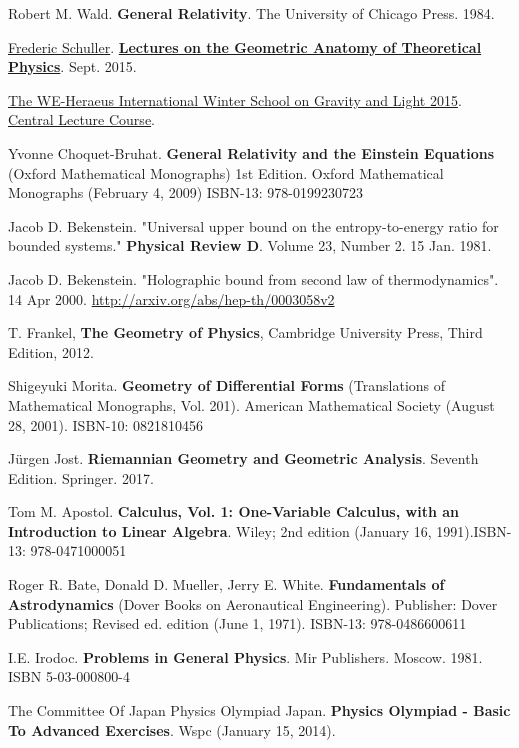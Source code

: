 \documentclass[10pt]{amsart}
\begin{document}
\begin{thebibliography}{9}
Robert M. Wald. \textbf{General Relativity}. The University of Chicago Press. 1984.

\href{https://www.youtube.com/c/FredericSchuller}{Frederic Schuller}. \href{https://youtube.com/playlist?list=PLPH7f_7ZlzxTi6kS4vCmv4ZKm9u8g5yic}{\textbf{Lectures on the Geometric Anatomy of Theoretical Physics}}. Sept. 2015.

\href{https://www.youtube.com/@thewe-heraeusinternational2060/featured}{The WE-Heraeus International Winter School on Gravity and Light 2015}. \href{https://youtube.com/playlist?list=PLFeEvEPtX_0S6vxxiiNPrJbLu9aK1UVC_}{Central Lecture Course}.  

Yvonne Choquet-Bruhat.  \textbf{General Relativity and the Einstein Equations} (Oxford Mathematical Monographs) 1st Edition.  Oxford Mathematical Monographs (February 4, 2009) ISBN-13: 978-0199230723

Jacob D. Bekenstein. "Universal upper bound on the entropy-to-energy ratio for bounded systems." \textbf{Physical Review D}. Volume 23, Number 2. 15 Jan. 1981.

Jacob D. Bekenstein. "Holographic bound from second law of thermodynamics". 14 Apr 2000. \url{http://arxiv.org/abs/hep-th/0003058v2}


T. Frankel,
\textbf{The Geometry of Physics}, 
Cambridge University Press, 
Third Edition,
2012.

Shigeyuki Morita. \textbf{Geometry of Differential Forms} (Translations of Mathematical Monographs, Vol. 201). American Mathematical Society (August 28, 2001). ISBN-10: 0821810456

J\"{u}rgen Jost. \textbf{Riemannian Geometry and Geometric Analysis}. Seventh Edition. Springer. 2017.

Tom M. Apostol. \textbf{Calculus, Vol. 1: One-Variable Calculus, with an Introduction to Linear Algebra}. Wiley; 2nd edition (January 16, 1991).ISBN-13: 978-0471000051

Roger R. Bate, Donald D. Mueller, Jerry E. White. \textbf{Fundamentals of Astrodynamics} (Dover Books on Aeronautical Engineering). Publisher: Dover Publications; Revised ed. edition (June 1, 1971). ISBN-13: 978-0486600611

I.E. Irodoc. \textbf{Problems in General Physics}. Mir Publishers. Moscow. 1981. ISBN 5-03-000800-4

The Committee Of Japan Physics Olympiad Japan. \textbf{Physics Olympiad - Basic To Advanced Exercises}.
Wspc (January 15, 2014).


\end{thebibliography}
\end{document}
